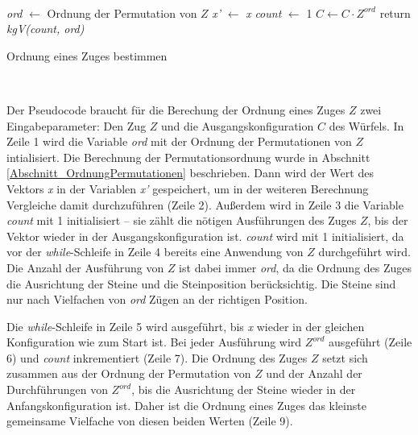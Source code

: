 \documentclass[12pt,a4paper, usenames, dvipsnames]{article}
\theoremstyle{mystyle}
\theoremstyle{definition}
\begin{document}
\begin{minipage}[H]{0.15\textwidth}
      $\ $
\end{minipage}
\begin{minipage}[H]{0.65\textwidth}
\begin{algorithm}[H]
\LinesNumbered
\DontPrintSemicolon
{}
\BlankLine
 \textit{ord} $\leftarrow$ Ordnung der Permutation von $Z$\;
  \textit{x'} $\leftarrow$ \textit{x}\;
  \textit{count} $\leftarrow$ 1\;
\BlankLine 
  $C \leftarrow C \cdot  Z^\textit{ord}$ \; 
 return \textit{kgV(count, ord)} \;

\caption{Ordnung eines Zuges bestimmen} 
\end{algorithm}
\end{minipage}
\begin{minipage}[H]{0.2\textwidth}
      $\ $
\end{minipage}

\vspace*{1em}

Der Pseudocode braucht für die Berechung der Ordnung eines Zuges $Z$ zwei Eingabeparameter: Den Zug $Z$ und die Ausgangskonfiguration $C$ des Würfels. In Zeile 1 wird die Variable \textit{ord} mit der Ordnung der Permutationen von $Z$ intialisiert. Die Berechnung der Permutationsordnung wurde in Abschnitt \ref{Abschnitt_OrdnungPermutationen} beschrieben. Dann wird der Wert des Vektors \textit{x} in der Variablen \textit{x'} gespeichert, um in der weiteren Berechnung Vergleiche damit durchzuführen (Zeile 2). Außerdem wird in Zeile 3 die Variable \textit{count} mit 1 initialisiert -- sie zählt die nötigen Ausführungen des Zuges $Z$, bis der Vektor wieder in der Ausgangskonfiguration ist. \textit{count} wird mit 1 initialisiert, da vor der \textit{while}-Schleife in Zeile 4 bereits eine Anwendung von $Z$ durchgeführt wird. Die Anzahl der Ausführung von $Z$ ist dabei immer \textit{ord}, da die Ordnung des Zuges die Ausrichtung der Steine und die Steinposition berücksichtig. Die Steine sind nur nach Vielfachen von \textit{ord} Zügen an der richtigen Position.

Die \textit{while}-Schleife in Zeile 5 wird ausgeführt, bis \textit{x} wieder in der gleichen Konfiguration wie zum Start ist. Bei jeder Ausführung wird $Z^\textit{ord}$ ausgeführt (Zeile 6) und \textit{count} inkrementiert (Zeile 7).
Die Ordnung des Zuges $Z$ setzt sich zusammen aus der Ordnung der Permutation von $Z$ und der Anzahl der Durchführungen von $Z^\textit{ord}$, bis die Ausrichtung der Steine wieder in der Anfangskonfiguration ist. Daher ist die Ordnung eines Zuges das kleinste gemeinsame Vielfache von diesen beiden Werten (Zeile 9).
\end{document}

